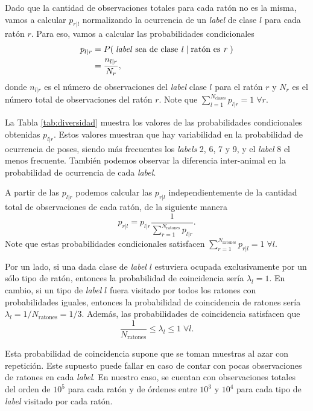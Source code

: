 Dado que la cantidad de observaciones totales para cada ratón no es la misma, vamos a calcular $p_{r|l}$ normalizando la ocurrencia de un \textit{label} de clase $l$ para cada ratón $r$. Para eso, vamos a calcular las probabilidades condicionales
\begin{align}
    p_{l|r} &= P(\; \text{\textit{label} sea de clase \textit{l}} \;|\; \text{ratón es \textit{r}} \;)\\
    &= \frac{n_{l|r}}{N_r},
\end{align}
donde $n_{l|r}$ es el número de observaciones del \textit{label} clase $l$ para el ratón $r$ y $N_r$ es el número total de observaciones del ratón $r$. Note que $\sum_{l=1}^{N_{\mathrm{clases}}} p_{l|r} = 1 \; \forall r$.

La Tabla \ref{tab:diversidad} muestra los valores de las probabilidades condicionales obtenidas $p_{l|r}$. Estos valores muestran que hay variabilidad en la probabilidad de ocurrencia de poses, siendo más frecuentes los \textit{labels} 2, 6, 7 y 9, y el \textit{label} 8 el  menos frecuente. También podemos observar la diferencia inter-animal en la probabilidad de ocurrencia de cada \textit{label}.

A partir de las $p_{l|r}$ podemos calcular las $p_{r|l}$ independientemente de la cantidad total de observaciones de cada ratón, de la siguiente manera
\begin{equation}
    p_{r|l} = p_{l|r} \frac{1}{\sum_{r=1}^{N_{\mathrm{ratones}}} p_{l|r}}.
\end{equation}
Note que estas probabilidades condicionales satisfacen $\sum_{r=1}^{N_{\mathrm{ratones}}} p_{r|l} = 1 \; \forall l$.

Por un lado, si una dada clase de \textit{label} $l$ estuviera ocupada exclusivamente por un sólo tipo de ratón, entonces la probabilidad de coincidencia sería $\lambda_l = 1$. En cambio, si un tipo de \textit{label} $l$ fuera visitado por todos los ratones con probabilidades iguales, entonces la probabilidad de coincidencia de ratones sería $\lambda_l = 1/N_{\mathrm{ratones}} = 1/3$. Además, las probabilidades de coincidencia satisfacen que
\begin{equation}
    \frac{1}{N_{\mathrm{ratones}}} \le \lambda_l \le 1 \; \forall l.
\end{equation}

Esta probabilidad de coincidencia supone que se toman muestras al azar con repetición. Este supuesto puede fallar en caso de contar con pocas observaciones de ratones en cada \textit{label}. En nuestro caso, se cuentan con observaciones totales del orden de $10^5$ para cada ratón y de órdenes entre $10^3$ y $10^4$ para cada tipo de \textit{label} visitado por cada ratón.

